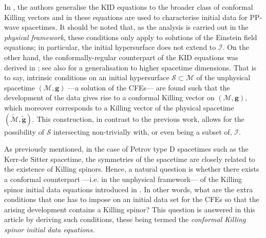 \documentclass[10pt,a4paper]{article}
\theoremstyle{plain}
\def\bmg{{\bm g}}
\begin{document}
In \cite{GarKha19}, the authors generalise the KID equations to the broader class of conformal Killing vectors
and in \cite{Gar22} these equations are used to characterise initial data for PP-wave spacetimes. It should be noted that, as the analysis is carried out in the \emph{physical framework}, these conditions only apply to solutions of the Einstein field equations; in particular, the initial hypersurface does not extend to $\mathscr{I}$. On the other hand, the conformally-regular counterpart of the KID equations was derived in \cite{Pae14a}; see also \cite{MarPeo22}
for a generalisation to higher spacetime dimensions.
That is to say, intrinsic conditions on an initial hypersurface
$\mathcal{S}\subset \mathcal{M}$ of the unphysical spacetime $(\mathcal{M},\bmg)$ ---a solution of the CFEs--- are found such that the development of the data gives rise to a conformal Killing vector on $(\mathcal{M},\bmg)$, which moreover corresponds to a Killing vector of the physical spacetime $(\tilde{\mathcal{M}},\tilde{\bmg})$. This construction, in contrast to the previous work, allows for the possibility of $\mathcal{S}$ intersecting non-trivially with, or even being a subset of, 
$\mathscr{I}$.  

\medskip

As previously mentioned, in the case of Petrov type
D spacetimes such as the Kerr-de Sitter spacetime, the symmetries of
the spacetime are closely related to the existence of Killing spinors.
Hence, a natural question is whether there exists a conformal
counterpart ---i.e. in the unphysical framework--- of the Killing spinor
initial data equations introduced in \cite{GarVal08c}. In other words, what are the extra conditions that one has to impose on an initial data set for the CFEs so that the arising development contains a Killing spinor? This question is answered in
this article by deriving such conditions, these being termed the
\emph{conformal Killing spinor initial data equations}. 
\end{document}
